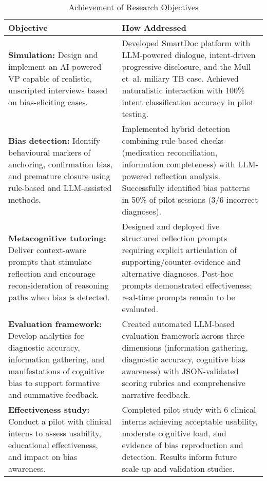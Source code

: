 \begin{table}[h]
\centering
\caption{Achievement of Research Objectives}
\label{tab:objectives-achievement}
\small
\begin{tabular}{p{} p{}}
\toprule
\textbf{Objective} & \textbf{How Addressed} \\
\midrule

\textbf{Simulation:} Design and implement an AI-powered VP capable of realistic, unscripted interviews based on bias-eliciting cases. &
Developed SmartDoc platform with LLM-powered dialogue, intent-driven progressive disclosure, and the Mull et~al. miliary TB case. Achieved naturalistic interaction with 100\% intent classification accuracy in pilot testing. \\
\midrule

\textbf{Bias detection:} Identify behavioural markers of anchoring, confirmation bias, and premature closure using rule-based and LLM-assisted methods. &
Implemented hybrid detection combining rule-based checks (medication reconciliation, information completeness) with LLM-powered reflection analysis. Successfully identified bias patterns in 50\% of pilot sessions (3/6 incorrect diagnoses). \\
\midrule

\textbf{Metacognitive tutoring:} Deliver context-aware prompts that stimulate reflection and encourage reconsideration of reasoning paths when bias is detected. &
Designed and deployed five structured reflection prompts requiring explicit articulation of supporting/counter-evidence and alternative diagnoses. Post-hoc prompts demonstrated effectiveness; real-time prompts remain to be evaluated. \\
\midrule

\textbf{Evaluation framework:} Develop analytics for diagnostic accuracy, information gathering, and manifestations of cognitive bias to support formative and summative feedback. &
Created automated LLM-based evaluation framework across three dimensions (information gathering, diagnostic accuracy, cognitive bias awareness) with JSON-validated scoring rubrics and comprehensive narrative feedback. \\
\midrule

\textbf{Effectiveness study:} Conduct a pilot with clinical interns to assess usability, educational effectiveness, and impact on bias awareness. &
Completed pilot study with 6 clinical interns achieving acceptable usability, moderate cognitive load, and evidence of bias reproduction and detection. Results inform future scale-up and validation studies.\\
\bottomrule
\end{tabular}
\end{table}

